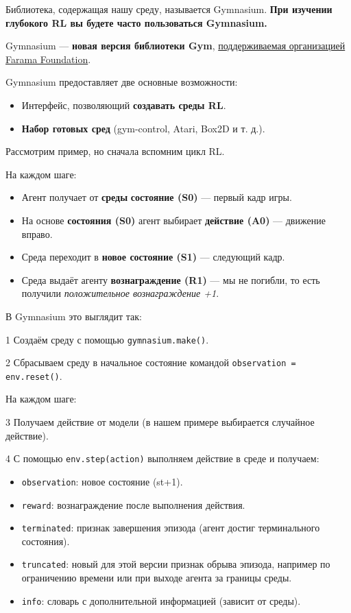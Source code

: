 \documentclass[11pt,a4paper]{article}
\begin{document}
Библиотека, содержащая нашу среду, называется Gymnasium. \textbf{При изучении глубокого RL вы будете часто пользоваться Gymnasium.}

Gymnasium --- \textbf{новая версия библиотеки Gym}, \href{https://farama.org/}{поддерживаемая организацией Farama Foundation}.

Gymnasium предоставляет две основные возможности:

\begin{itemize}
\tightlist
\item
  Интерфейс, позволяющий \textbf{создавать среды RL}.
\item
  \textbf{Набор готовых сред} (gym-control, Atari, Box2D и т. д.).
\end{itemize}

Рассмотрим пример, но сначала вспомним цикл RL.


На каждом шаге:

\begin{itemize}
\tightlist
\item
  Агент получает от \textbf{среды} \textbf{состояние (S0)} --- первый кадр игры.
\item
  На основе \textbf{состояния (S0)} агент выбирает \textbf{действие (A0)} --- движение вправо.
\item
  Среда переходит в \textbf{новое состояние (S1)} --- следующий кадр.
\item
  Среда выдаёт агенту \textbf{вознаграждение (R1)} --- мы не погибли, то есть получили \emph{положительное вознаграждение +1}.
\end{itemize}

В Gymnasium это выглядит так:

1 Создаём среду с помощью \passthrough{\lstinline!gymnasium.make()!}.

2 Сбрасываем среду в начальное состояние командой \passthrough{\lstinline!observation = env.reset()!}.

На каждом шаге:

3 Получаем действие от модели (в нашем примере выбирается случайное действие).

4 С помощью \passthrough{\lstinline!env.step(action)!} выполняем действие в среде и получаем:

\begin{itemize}
\tightlist
\item
  \passthrough{\lstinline!observation!}: новое состояние (st+1).
\item
  \passthrough{\lstinline!reward!}: вознаграждение после выполнения действия.
\item
  \passthrough{\lstinline!terminated!}: признак завершения эпизода (агент достиг терминального состояния).
\item
  \passthrough{\lstinline!truncated!}: новый для этой версии признак обрыва эпизода, например по ограничению времени или при выходе агента за границы среды.
\item
  \passthrough{\lstinline!info!}: словарь с дополнительной информацией (зависит от среды).
\end{itemize}
\end{document}
